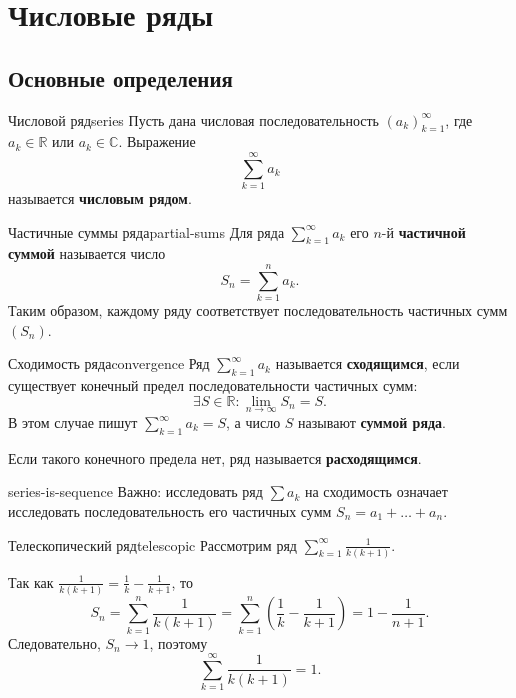 
\section{Числовые ряды}

\subsection{Основные определения}

\begin{Definition}{Числовой ряд}{series}
	Пусть дана числовая последовательность $(a_k)_{k=1}^{\infty}$, где $a_k \in \mathbb{R}$ или $a_k \in \mathbb{C}$. Выражение
	\[
	\sum_{k=1}^{\infty} a_k
	\]
	называется \textbf{числовым рядом}.
\end{Definition}

\begin{Definition}{Частичные суммы ряда}{partial-sums}
	Для ряда $\sum\limits_{k=1}^{\infty} a_k$ его $n$-й \textbf{частичной суммой} называется число
	\[
	S_n = \sum_{k=1}^{n} a_k.
	\]
	Таким образом, каждому ряду соответствует последовательность частичных сумм $(S_n)$.
\end{Definition}

\begin{Definition}{Сходимость ряда}{convergence}
	Ряд $\sum\limits_{k=1}^{\infty} a_k$ называется \textbf{сходящимся}, если существует конечный предел последовательности частичных сумм:
	\[
	\exists S \in \mathbb{R} \colon \lim_{n\to\infty} S_n = S.
	\]
	В этом случае пишут $\sum\limits_{k=1}^{\infty} a_k = S$, а число $S$ называют \textbf{суммой ряда}.
	
	Если такого конечного предела нет, ряд называется \textbf{расходящимся}.
\end{Definition}

\begin{Remark}{}{series-is-sequence}
	Важно: исследовать ряд $\sum a_k$ на сходимость означает исследовать последовательность его частичных сумм $S_n = a_1 + \dots + a_n$.
\end{Remark}

\begin{Example}{Телескопический ряд}{telescopic}
	Рассмотрим ряд $\sum\limits_{k=1}^{\infty} \frac{1}{k(k+1)}$.
	
	Так как $\frac{1}{k(k+1)} = \frac1k - \frac{1}{k+1}$, то
	\[
	S_n
	=
	\sum_{k=1}^{n} \frac{1}{k(k+1)}
	=
	\sum_{k=1}^{n} \left(\frac1k - \frac{1}{k+1}\right)
	=
	1 - \frac{1}{n+1}.
	\]
	Следовательно, $S_n \to 1$, поэтому
	\[
	\sum_{k=1}^{\infty} \frac{1}{k(k+1)} = 1.
	\]
\end{Example}

